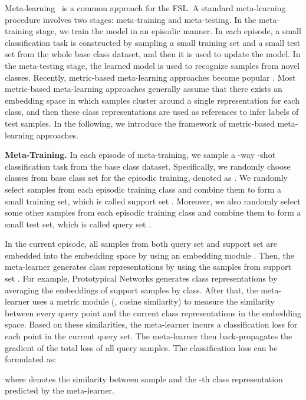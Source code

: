 \documentclass[10pt,twocolumn,letterpaper]{article}
\begin{document}
Meta-learning~\cite{Wang2018cvprlsl,Snell2017nips,vinyals2016bnips,Finn2017icml,Chen2019NIPS} is a common approach for the FSL.
A standard meta-learning procedure involves two stages: meta-training and meta-testing. 
In the meta-training stage, we train the model in an episodic manner. In each episode, a small classification task is constructed by sampling a small training set and a small test set from the whole base class dataset, and then it is used to update the model.
In the meta-testing stage, the learned model is used to recognize samples from novel classes.
Recently, metric-based meta-learning approaches become popular \cite{Chen2019NIPS,Gidaris2018cvpr}. 
Most metric-based meta-learning approaches generally assume that there exists an embedding space in which samples cluster around a single representation for each class, and
then these class representations are used as references to infer labels of test samples. In the following, we introduce the framework of metric-based meta-learning approaches.  
 

\noindent\textbf{Meta-Training.} 
In each episode of meta-training, we sample a -way -shot classification task from the base class dataset. Specifically, we randomly choose  classes from base class set  for the episodic training, denoted as . We randomly select  samples from each episodic training class and combine them to form a small training set, which is called support set . Moreover, we also randomly select some other samples from each episodic training class and combine them to form a small test set, which is called query set .

In the current episode, all samples from both query set and support set are embedded into the embedding space by using an embedding module . Then, the meta-learner generates class representations  by using the samples from support set . 
For example, Prototypical Networks \cite{Snell2017nips} generates class representations by averaging the embeddings of support samples by class. After that, the meta-learner uses a metric module  (\eg, cosine similarity) to measure the similarity between every query point  and the current class representations in the embedding space. Based on these similarities, the meta-learner incurs a classification loss for each point in the current query set. The meta-learner then back-propagates the gradient of the total loss of all query samples. The classification loss can be formulated as:

where  denotes the similarity between sample  and the -th class representation  predicted by the meta-learner.
\end{document}
